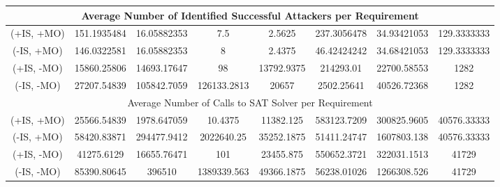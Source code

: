 \begin{landscape}
\begin{table}[!t]
\begin{tabular}{|c|c|c|c|c|c|c|c|}
			\multicolumn{8}{|c|}{Average Number of Identified Successful Attackers per Requirement}                            \\ \hline
			(+IS, +MO) & 151.1935484  & 16.05882353 & 7.5         & 2.5625      & 237.3056478 & 34.93421053 & 129.3333333      \\
			(-IS, +MO) & 146.0322581  & 16.05882353 & 8           & 2.4375      & 46.42424242 & 34.68421053 & 129.3333333      \\
			(+IS, -MO) & 15860.25806  & 14693.17647 & 98          & 13792.9375  & 214293.01   & 22700.58553 & 1282             \\
			(-IS, -MO) & 27207.54839  & 105842.7059 & 126133.2813 & 20657       & 2502.25641  & 40526.72368 & 1282             \\ 
			\hline
			\multicolumn{8}{|c|}{Average Number of Calls to SAT Solver per Requirement}                                        \\ \hline
			(+IS, +MO) & 25566.54839  & 1978.647059 & 10.4375     & 11382.125   & 583123.7209 & 300825.9605 & 40576.33333      \\
			(-IS, +MO) & 58420.83871  & 294477.9412 & 2022640.25  & 35252.1875  & 51411.24747 & 1607803.138 & 40576.33333      \\
			(+IS, -MO) & 41275.6129   & 16655.76471 & 101         & 23455.875   & 550652.3721 & 322031.1513 & 41729            \\
			(-IS, -MO) & 85390.80645  & 396510      & 1389339.563 & 49366.1875  & 56238.01026 & 1266308.526 & 41729            \\ \hline

\end{tabular}
\end{table}
\end{landscape}
